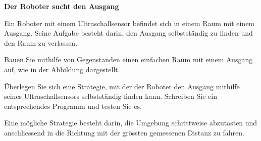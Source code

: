 \begin{myexercise}
    \textbf{Der Roboter sucht den Ausgang}

    Ein Roboter mit einem Ultraschallsensor befindet sich
    in einem Raum mit einem Ausgang. Seine Aufgabe besteht
    darin, den Ausgang selbstständig zu finden und den
    Raum zu verlassen.

    \begin{center}
    \end{center}

    Bauen Sie mithilfe von Gegenständen einen einfachen
    Raum mit einem Ausgang auf, wie in der Abbildung
    dargestellt.

    Überlegen Sie sich eine Strategie, mit der der Roboter
    den Ausgang mithilfe seines Ultraschallsensors
    selbstständig finden kann. Schreiben Sie ein
    entsprechendes Programm und testen Sie es.


    \begin{myanswer}
        Eine mögliche Strategie besteht darin, die
        Umgebung schrittweise abzutasten und anschliessend
        in die Richtung mit der grössten gemessenen
        Distanz zu fahren.


\end{myanswer}
\end{myexercise}
